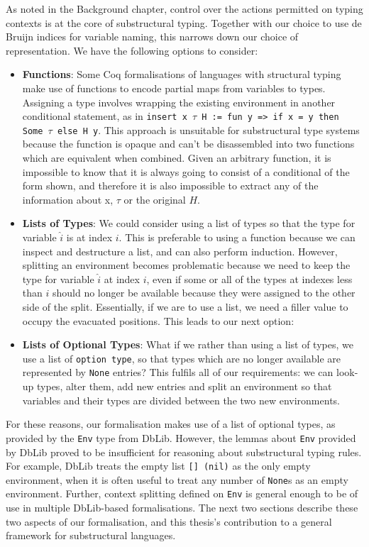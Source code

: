 \documentclass[]{unswthesis}
\let\c\texttt
\begin{document}
As noted in the Background chapter, control over the actions permitted on typing contexts is at the core of substructural typing. Together with our choice to use de Bruijn indices for variable naming, this narrows down our choice of representation. We have the following options to consider:

\begin{itemize}
\item \textbf{Functions}: Some Coq formalisations of languages with structural typing \cite{pierce15} make use of functions to encode partial maps from variables to types. Assigning a type involves wrapping the existing environment in another conditional statement, as in \c{insert x $\tau$ H := fun y => if x = y then Some $\tau$ else H y}. This approach is unsuitable for substructural type systems because the function is opaque and can't be disassembled into two functions which are equivalent when combined. Given an arbitrary function, it is impossible to know that it is always going to consist of a conditional of the form shown, and therefore it is also impossible to extract any of the information about x, $\tau$ or the original $H$.
\item \textbf{Lists of Types}: We could consider using a list of types so that the type for variable $\hat{i}$ is at index $i$. This is preferable to using a function because we can inspect and destructure a list, and can also perform induction. However, splitting an environment becomes problematic because we need to keep the type for variable $\hat{i}$ at index $i$, even if some or all of the types at indexes less than $i$ should no longer be available because they were assigned to the other side of the split. Essentially, if we are to use a list, we need a filler value to occupy the evacuated positions. This leads to our next option:
\item \textbf{Lists of Optional Types}: What if we rather than using a list of types, we use a list of \c{option type}, so that types which are no longer available are represented by \c{None} entries? This fulfils all of our requirements: we can look-up types, alter them, add new entries and split an environment so that variables and their types are divided between the two new environments.
\end{itemize}

For these reasons, our formalisation makes use of a list of optional types, as provided by the \c{Env} type from DbLib. However, the lemmas about \c{Env} provided by DbLib proved to be insufficient for reasoning about substructural typing rules. For example, DbLib treats the empty list \c{[] (nil)} as the only empty environment, when it is often useful to treat any number of \c{None}s as an empty environment. Further, context splitting defined on \c{Env} is general enough to be of use in multiple DbLib-based formalisations. The next two sections describe these two aspects of our formalisation, and this thesis's contribution to a general framework for substructural languages.
\end{document}
